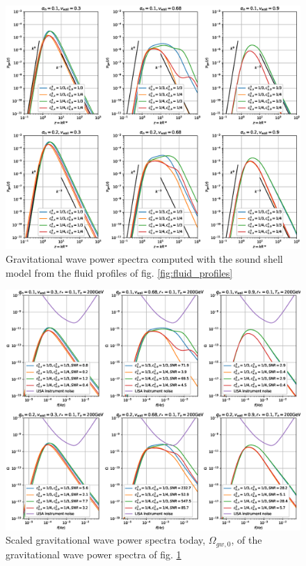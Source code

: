 \begin{figure}[ht!]
\centering
\includegraphics[width=\textwidth]{fig/const_cs_gw.eps}
\caption{Gravitational wave power spectra computed with the sound shell model from the fluid profiles of fig. \ref{fig:fluid_profiles}}
\label{fig:gw_spectra}
\end{figure}

\begin{figure}[ht!]
\centering
\includegraphics[width=\textwidth]{fig/const_cs_gw_omgw0.eps}
\caption{Scaled gravitational wave power spectra today, $\Omega_{gw,0}$, of the gravitational wave power spectra of fig. \ref{fig:gw_spectra}}
\label{fig:omgw0}
\end{figure}

